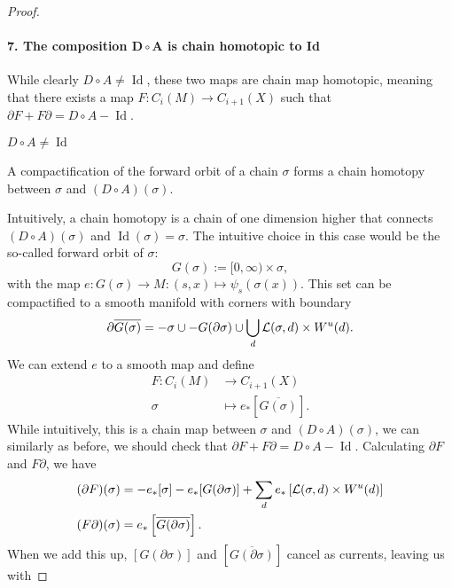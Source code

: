 \begin{proof}
\paragraph{7. The composition $\bm{D  \circ A}$ is chain homotopic to Id}
While clearly $D  \circ  A \neq \operatorname{Id}$, these two maps are chain map homotopic, meaning that there exists a map $F: C_i(M) \to  C_{i+1}(X)$ such that $\partial F + F \partial = D  \circ  A - \operatorname{Id}$.
\begin{marginfigure}
    \centering
    \caption{$D  \circ  A \neq  \operatorname{Id}$}
    \label{fig:d-na-a-is-not-identity}
\end{marginfigure}
\begin{marginfigure}
    \centering
    \caption{A compactification of the forward orbit of a chain $\sigma$ forms a chain homotopy between $\sigma$ and  $(D  \circ  A)(\sigma)$.}
    \label{fig:chain-homotopy-between-d-na-a-and-id}
\end{marginfigure}
Intuitively, a chain homotopy is a chain of one dimension higher that connects $(D  \circ  A)(\sigma)$ and $\operatorname{Id} (\sigma) = \sigma$.
The intuitive choice in this case would be the so-called forward orbit of $\sigma$:
\[
    G(\sigma) := [0, \infty) \times \sigma
,\] with the map $e: G(\sigma) \to  M: (s, x) \mapsto \psi_s (\sigma(x))$.
This set can be compactified to a smooth manifold with corners with boundary
\[
    \partial \overline{G(\sigma)} = - \sigma \cup - G(\partial \sigma) \cup \bigcup_{d}  \mathcal L(\sigma, d) \times W^u(d)
.\] 
We can extend $e$ to a smooth map and define 
\begin{align*}
    F: C_i(M) &\longrightarrow C_{i+1}(X) \\
    \sigma &\longmapsto e_* \left[ \overline{G(\sigma)} \right] 
.\end{align*}
While intuitively, this is a chain map between $\sigma$ and  $(D  \circ A)(\sigma)$, we can similarly as before, we should check that $\partial F + F \partial = D  \circ  A - \operatorname{Id}$.
Calculating $\partial F$ and  $F \partial$, we have
\begin{align*}
    (\partial F)(\sigma) &= -e_*[\sigma] - e_*[G(\partial \sigma)] + \sum_{d} e_*\left[\mathcal L(\sigma, d) \times W^u(d)\right]\\
    (F \partial)(\sigma) &= e_*\left[\overline{G(\partial \sigma)}\right]
    .\end{align*}
    When we add this up, $[G (\partial \sigma)]$ and $\left[ \overline{G(\partial \sigma)} \right]$ cancel as currents, leaving us with


\end{proof}
